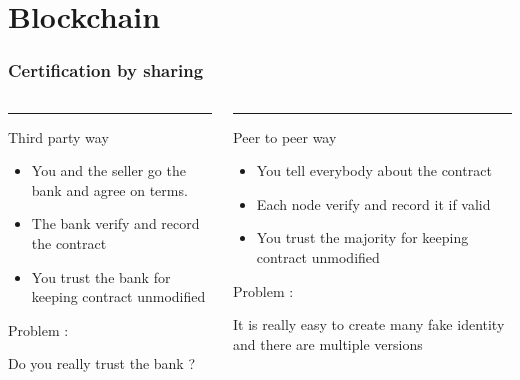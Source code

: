 \documentclass[12pt]{beamer}
\begin{document}
\section{Blockchain}



\begin{frame}
\frametitle{Certification by sharing}
\begin{center}
\vspace{-3mm}
\begin{columns}[T]
        \begin{column}{.48\textwidth}
            {\color{blue}\rule{\linewidth}{4pt}

            Third party way}
            \begin{itemize}
            \item You and the seller go the bank and agree on terms.
            \item The bank verify and record the contract
            \item You trust the bank for keeping contract unmodified
            \end{itemize}
            
            {\color{red} Problem :}
            
            Do you really trust the bank ?

        \end{column}
        \hfill
        \begin{column}{.48\linewidth}
            {\color{green!40!black}\rule{\linewidth}{4pt}

            Peer to peer way}
            
            \begin{itemize}
            \item You tell everybody about the contract
            \item Each node verify and record it if valid
            \item You trust the majority for keeping contract unmodified
            \end{itemize}           
            
            {\color{red} Problem :}
            
            It is really easy to create many fake identity and there are multiple versions

        \end{column}
    \end{columns}

\end{center}

\end{frame}
\end{document}

